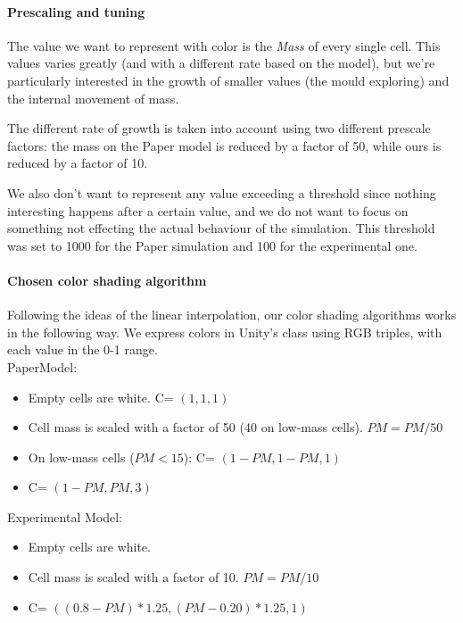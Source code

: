 \paragraph{Prescaling and tuning}

The value we want to represent with color is the \textit{Mass} of every single cell. This values varies greatly (and with a different rate based on the model), but we're particularly interested in the growth of smaller values (the mould exploring) and the internal movement of mass.

The different rate of growth is taken into account using two different prescale factors: the mass on the Paper model is reduced by a factor of 50, while ours is reduced by a factor of 10.

We also don't want to represent any value exceeding a threshold since nothing interesting happens after a certain value, and we do not want to focus on something not effecting the actual behaviour of the simulation. This threshold was set to 1000 for the Paper simulation and 100 for the experimental one.

\paragraph{Chosen color shading algorithm}

Following the ideas of the linear interpolation, our color shading algorithms works in the following way. We express colors in Unity's class using RGB triples, with each value in the 0-1 range.\\

PaperModel:

\begin{itemize}
    \item Empty cells are white. C= $(1,1,1)$
    \item Cell mass is scaled with a factor of 50 (40 on low-mass cells). $PM = PM/50$
    \item On low-mass cells ($PM < 15$): C= $(1-PM,1-PM,1)$
    \item C= $(1-PM,PM,3)$
\end{itemize}

Experimental Model:

\begin{itemize}
    \item Empty cells are white.
    \item Cell mass is scaled with a factor of 10. $PM = PM/10$
    \item C= $((0.8-PM)*1.25,(PM-0.20)*1.25,1)$
\end{itemize}


